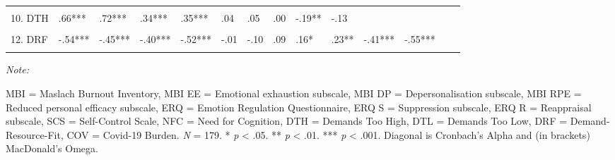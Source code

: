 \documentclass[
  english,
  man,floatsintext]{apa6}
\begin{document}
\begin{landscape}
\begin{table}
{\begin{threeparttable}
\begin{tabular}[t]{llllllllllllll}
\cellcolor{gray!6}{9. NFC} & \cellcolor{gray!6}{-.24**} & \cellcolor{gray!6}{-.18*} & \cellcolor{gray!6}{-.21**} & \cellcolor{gray!6}{-.20**} & \cellcolor{gray!6}{-.02} & \cellcolor{gray!6}{-.18*} & \cellcolor{gray!6}{.15*} & \cellcolor{gray!6}{.20**} & \cellcolor{gray!6}{} & \cellcolor{gray!6}{} & \cellcolor{gray!6}{} & \cellcolor{gray!6}{} & \cellcolor{gray!6}{}\\
10. DTH & .66*** & .72*** & .34*** & .35*** & .04 & .05 & .00 & -.19** & -.13 &  &  &  & \\
\addlinespace
\cellcolor{gray!6}{11. DTL} & \cellcolor{gray!6}{.44***} & \cellcolor{gray!6}{.35***} & \cellcolor{gray!6}{.37***} & \cellcolor{gray!6}{.42***} & \cellcolor{gray!6}{.01} & \cellcolor{gray!6}{.16*} & \cellcolor{gray!6}{-.13} & \cellcolor{gray!6}{-.18*} & \cellcolor{gray!6}{-.15*} & \cellcolor{gray!6}{.40***} & \cellcolor{gray!6}{} & \cellcolor{gray!6}{} & \cellcolor{gray!6}{}\\
12. DRF & -.54*** & -.45*** & -.40*** & -.52*** & -.01 & -.10 & .09 & .16* & .23** & -.41*** & -.55*** &  & \\
\cellcolor{gray!6}{13. COV} & \cellcolor{gray!6}{.23**} & \cellcolor{gray!6}{.32***} & \cellcolor{gray!6}{.07} & \cellcolor{gray!6}{.00} & \cellcolor{gray!6}{-.02} & \cellcolor{gray!6}{.02} & \cellcolor{gray!6}{-.06} & \cellcolor{gray!6}{-.03} & \cellcolor{gray!6}{.14} & \cellcolor{gray!6}{.44***} & \cellcolor{gray!6}{.08} & \cellcolor{gray!6}{-.12} & \cellcolor{gray!6}{}\\
\bottomrule
\end{tabular}
\begin{tablenotes}
\item \textit{Note: } 
\item MBI = Maslach Burnout Inventory, MBI EE = Emotional exhaustion subscale, MBI DP = Depersonalisation subscale, MBI RPE = Reduced personal efficacy subscale, ERQ = Emotion Regulation Questionnaire, ERQ S = Suppression subscale, ERQ R = Reappraisal subscale, SCS = Self-Control Scale, NFC = Need for Cognition, DTH = Demands Too High, DTL = Demands Too Low, DRF = Demand-Resource-Fit, COV = Covid-19 Burden. \textit{N} = 179. * \textit{p} < .05. ** \textit{p} < .01. *** \textit{p} < .001. Diagonal is Cronbach's Alpha and (in brackets) MacDonald's Omega.
\end{tablenotes}
\end{threeparttable}}
\end{table}
\end{landscape}
\end{document}
